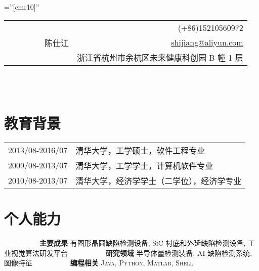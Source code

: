 \documentclass[a4paper,10pt]{professional-cv-cn}
\begin{document}
\pagestyle{empty}

\font\fb=''[cmr10]''

\begin{tabular}{lr}
\multirow{4}{24em}{\Huge ~~~~~~~~~陈仕江}

    & (+86)15210560972 \\

    & \href{mailto:shijiang@aliyun.com}{shijiang@aliyun.com} \\

    & 浙江省杭州市余杭区未来健康科创园 B 幢 1 层
\end{tabular}
\\
\\

\section{教育背景}
\begin{tabular}{rl}
 \textsc{2013/08-2016/07} & 清华大学，工学硕士，软件工程专业 \\
 \textsc{2009/08-2013/07} & 清华大学，工学学士，计算机软件专业 \\
 \textsc{2010/08-2013/07} & 清华大学，经济学学士（二学位），经济学专业
\end{tabular}

\section{个人能力}

\begin{entrylist}
  \internentry
    {~~~~~~~~~~\textbf{主要成果}}
    {}
    {}
    {\textsc{有图形晶圆缺陷检测设备}, \textsc{SiC 衬底和外延缺陷检测设备}, \textsc{工业视觉算法研发平台}}
  \internentry
    {~~~~~~~~~~\textbf{研究领域}}
    {}
    {}
    {\textsc{半导体量检测装备}, \textsc{AI 缺陷检测系统}, \textsc{图像特征}}
  \internentry
    {~~~~~~~~~~\textbf{编程相关}}
    {}
    {}
    {\textsc{Java}, \textsc{Python}, \textsc{Matlab}, \textsc{Shell}}
\end{entrylist}
\end{document}
